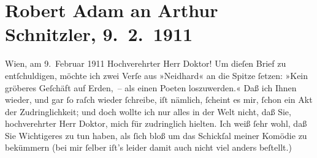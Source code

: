 

         \newcommand{\erwaehnteInstitutionen}{Institutionen: S. Fischer Verlag}
         \newcommand{\erwaehnteOrte}{Orte: Wien}
         \newcommand{\erwaehnteWerke}{Werke: Neidhard}
               \section[Robert Adam an Arthur Schnitzler, 9. 2. 1911]{ Robert Adam an Arthur Schnitzler, 9. 2. 1911}\nopagebreak{}\rehead{ }\begin{ledgroupsized}[t]{13cm}\normalsize\beginnumbering \toendnotes[C]{\smallbreak\pagebreak[2]} 
\toendnotes[C]{\smallbreak}\pstart
           \raggedleft{}{\pb}Wien, am 9. Februar 1911\pend
           \pstart{}Hochverehrter Herr Doktor!\pend\pstart
           Um dieſen Brief zu entſchuldigen, möchte ich zwei Verſe aus »Neidhard« an die Spitze ſetzen: »Kein gröberes Geſchäft auf
               Erden, – als einen Poeten loszuwerden.« Daß ich Ihnen wieder, und gar ſo raſch wieder
               ſchreibe, iſt nämlich, ſcheint es mir, ſchon ein Akt der Zudringlichkeit; und doch
               wollte ich nur alles in der Welt nicht, daß Sie, hochverehrter Herr Doktor, mich für
               zudringlich hielten. Ich weiß ſehr wohl, daß Sie Wichtigeres zu tun haben, als ſich
               bloß um das Schickſal meiner Komödie zu beküm{\pb}mern (bei mir ſelber iſt’s
               leider damit auch nicht viel anders beſtellt.)\pend

\end{ledgroupsized}

